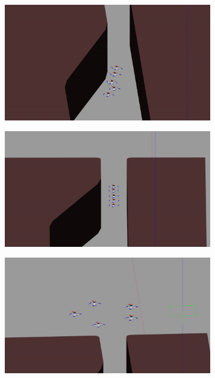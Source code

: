 \begin{figure}
\begin{subfigure}[b]{0.325\textwidth}
    \caption{}
    \end{subfigure}
    \begin{subfigure}[b]{0.325\textwidth}
    \includegraphics[width=\textwidth]{paper3/images/gazebo_04.png}
    \caption{}
    \end{subfigure}
    \begin{subfigure}[b]{0.325\textwidth}
    \includegraphics[width=\textwidth]{paper3/images/gazebo_05.png}
    \caption{}
    \end{subfigure}
    \begin{subfigure}[b]{0.325\textwidth}
    \includegraphics[width=\textwidth]{paper3/images/gazebo_06.png}

\end{subfigure}
\end{figure}
